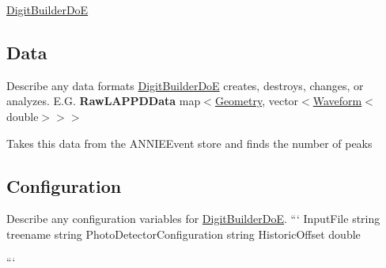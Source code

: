 \hyperlink{classDigitBuilderDoE}{Digit\-Builder\-Do\-E} \subsection*{Data}

Describe any data formats \hyperlink{classDigitBuilderDoE}{Digit\-Builder\-Do\-E} creates, destroys, changes, or analyzes. E.\-G. {\bfseries Raw\-L\-A\-P\-P\-D\-Data} {\ttfamily map$<$\hyperlink{classGeometry}{Geometry}, vector$<$\hyperlink{classWaveform}{Waveform}$<$double$>$$>$$>$}
\begin{DoxyItemize}
\item Takes this data from the {\ttfamily A\-N\-N\-I\-E\-Event} store and finds the number of peaks
\end{DoxyItemize}

\subsection*{Configuration}

Describe any configuration variables for \hyperlink{classDigitBuilderDoE}{Digit\-Builder\-Do\-E}. ``` Input\-File string treename string Photo\-Detector\-Configuration string Historic\-Offset double

``` 